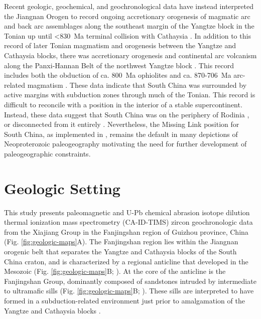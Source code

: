 Recent geologic, geochemical, and geochronological data have instead interpreted the Jiangnan Orogen to record ongoing accretionary orogenesis of magmatic arc and back arc assemblages along the southeast margin of the Yangtze block in the Tonian up until \textless830~Ma terminal collision with Cathaysia \citep{Cawood2017a, Yan2019a}. In addition to this record of later Tonian magmatism and orogenesis between the Yangtze and Cathaysia blocks, there was accretionary orogenesis and continental arc volcanism along the Panxi-Hannan Belt of the northwest Yangtze block \citep{Cawood2017a}. This record includes both the obduction of ca. 800~Ma ophiolites \citep{Zhao2017a} and ca. 870-706~Ma arc-related magmatism \citep{Dong2012a}. These data indicate that South China was surrounded by active margins with subduction zones through much of the Tonian. This record is difficult to reconcile with a position in the interior of a stable supercontinent. Instead, these data suggest that South China was on the periphery of Rodinia \citep{Cawood2017a}, or disconnected from it entirely \citep{Merdith2017a}. Nevertheless, the Missing Link position for South China, as implemented in \citet{Li2008a}, remains the default in many depictions of Neoproterozoic paleogeography motivating the need for further development of paleogeographic constraints.

\section{Geologic Setting}

This study presents paleomagnetic and U-Pb chemical abrasion isotope dilution thermal ionization mass spectrometry (CA-ID-TIMS) zircon geochronologic data from the Xiajiang Group in the Fanjingshan region of Guizhou province, China (Fig. \ref{fig:geologic-maps}A). The Fanjingshan region lies within the Jiangnan orogenic belt that separates the Yangtze and Cathaysia blocks of the South China craton, and is characterized by a regional anticline that developed in the Mesozoic (Fig. \ref{fig:geologic-maps}B; \citealp{Li2016c, Ma2019a}). At the core of the anticline is the Fanjingshan Group, dominantly composed of sandstones intruded by intermediate to ultramafic sills (Fig. \ref{fig:geologic-maps}B; \citealp{Wang2014a}). These sills are interpreted to have formed in a subduction-related environment just prior to amalgamation of the Yangtze and Cathaysia blocks \citep{Wang2014a}.

